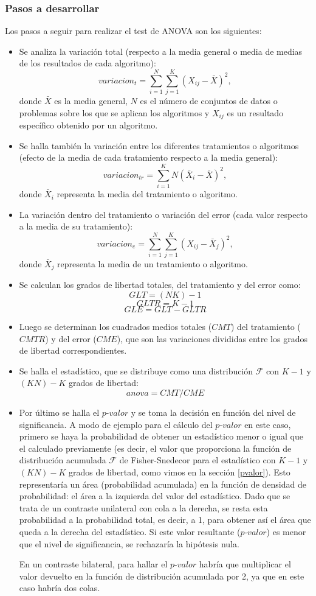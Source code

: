 \subsubsection{Pasos a desarrollar}
Los pasos a seguir para realizar el test de ANOVA son los siguientes:
\begin{itemize}
\item Se analiza la variación total (respecto a la media general o media de medias de los resultados de cada
algoritmo):
\[ variacion_t = \sum_{i=1}^{N} \sum_{j=1}^{K} (X_{ij} - \bar{X})^2, \]
donde $\bar{X}$ es la media general, $N$ es el número de conjuntos de datos o problemas sobre los que se
aplican los algoritmos y $X_{ij}$ es un resultado específico obtenido por un algoritmo.
\item Se halla también la variación entre los diferentes tratamientos o algoritmos (efecto de la media de cada
tratamiento respecto a la media general):
\[ variacion_{tr} = \sum_{i=1}^{K} N (\bar{X}_i - \bar{X})^2, \]
donde $\bar{X}_i$ representa la media del tratamiento o algoritmo.
\item La variación dentro del tratamiento o variación del error (cada valor respecto a la media de su tratamiento):
\[ variacion_e = \sum_{i=1}^{N} \sum_{j=1}^{K} (X_{ij} - \bar{X}_{j})^2, \]
donde $\bar{X}_{j}$ representa la media de un tratamiento o algoritmo.
\item Se calculan los grados de libertad totales, del tratamiento y del error como:
\[ GLT = (NK)-1 \]
\[ GLTR = K-1 \]
\[ GLE = GLT - GLTR \]
\item Luego se determinan los cuadrados medios totales ($CMT$) del tratamiento ($CMTR$) y del error ($CME$),
que son las variaciones divididas entre los grados de libertad correspondientes.
\item Se halla el estadístico, que se distribuye como una distribución $\mathcal{F}$ con $K-1$ y $(KN)-K$ grados de libertad:
\[ anova = CMT / CME \]
\item Por último se halla el $\textit{p-valor}$ y se toma la decisión en función del nivel de significancia. A modo
de ejemplo para el cálculo del $\textit{p-valor}$ en este caso, primero se haya la probabilidad de obtener un
estadístico menor o igual que el calculado previamente (es decir, el valor que proporciona la función de distribución acumulada $\mathcal{F}$ de Fisher-Snedecor para el estadístico con $K-1$ y $(KN)-K$ grados de libertad, como vimos en
la sección \ref{pvalor}). Esto representaría un área (probabilidad acumulada) en la función de densidad de
probabilidad: el área a la izquierda del valor del estadístico. Dado que se trata de un contraste unilateral con cola
a la derecha, se resta esta probabilidad a la probabilidad total, es decir, a 1, para obtener así el área que queda a la derecha del estadístico. Si este valor resultante ($\textit{p-valor}$) es menor que el nivel de significancia, se
rechazaría la hipótesis nula.

En un contraste bilateral, para hallar el $\textit{p-valor}$ habría que multiplicar el valor devuelto en la función de distribución acumulada por 2, ya que en este caso habría dos colas.
\end{itemize}

